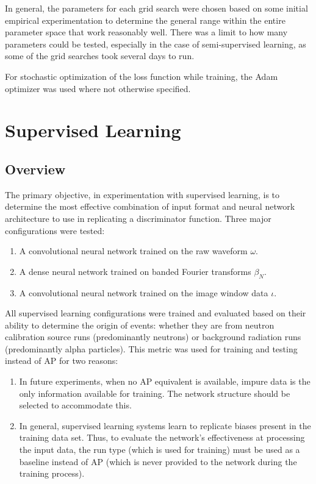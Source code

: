 \documentclass[10pt]{article}
\begin{document}
In general, the parameters for each grid search were chosen based on some initial empirical experimentation to determine the general range within the entire parameter space that work reasonably well. There was a limit to how many parameters could be tested, especially in the case of semi-supervised learning, as some of the grid searches took several days to run.

For stochastic optimization of the loss function while training, the Adam \cite{adam} optimizer was used where not otherwise specified.

\section{Supervised Learning}

\subsection{Overview}

The primary objective, in experimentation with supervised learning, is to determine the most effective combination of input format and neural network architecture to use in replicating a discriminator function. Three major configurations were tested:

\begin{enumerate}
    \item A convolutional neural network trained on the raw waveform $\omega$.
    \item A dense neural network trained on banded Fourier transforms $\beta_{N}$.
    \item A convolutional neural network trained on the image window data $\iota$.
\end{enumerate}

All supervised learning configurations were trained and evaluated based on their ability to determine the origin of events: whether they are from neutron calibration source runs (predominantly neutrons) or background radiation runs (predominantly alpha particles). This metric was used for training and testing instead of AP for two reasons:

\begin{enumerate}
    \item In future experiments, when no AP equivalent is available, impure data is the only information available for training. The network structure should be selected to accommodate this.
    \item In general, supervised learning systems learn to replicate biases present in the training data set. Thus, to evaluate the network's effectiveness at processing the input data, the run type (which is used for training) must be used as a baseline instead of AP (which is never provided to the network during the training process).
\end{enumerate}
\end{document}
